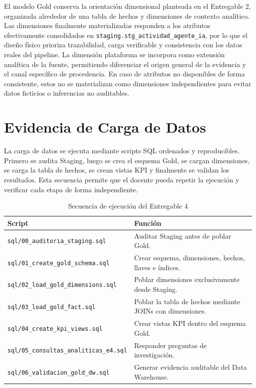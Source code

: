 \documentclass[12pt,a4paper]{article}
\newcommand{\StagingTabla}{\texttt{staging.\allowbreak stg\_actividad\_\allowbreak agente\_ia}}
\newcommand{\pathcode}[1]{\begingroup\scriptsize\ttfamily\nolinkurl{#1}\endgroup}
\begin{document}
El modelo Gold conserva la orientaci\'on dimensional planteada en el Entregable 2, organizada alrededor de una tabla de hechos y dimensiones de contexto anal\'itico. Las dimensiones finalmente materializadas responden a los atributos efectivamente consolidados en \StagingTabla{}, por lo que el dise\~no f\'isico prioriza trazabilidad, carga verificable y consistencia con los datos reales del pipeline. La dimensi\'on plataforma se incorpora como extensi\'on anal\'itica de la fuente, permitiendo diferenciar el origen general de la evidencia y el canal espec\'ifico de procedencia. En caso de atributos no disponibles de forma consistente, estos no se materializan como dimensiones independientes para evitar datos ficticios o inferencias no auditables.

\section{Evidencia de Carga de Datos}

La carga de datos se ejecuta mediante scripts SQL ordenados y reproducibles. Primero se audita Staging, luego se crea el esquema Gold, se cargan dimensiones, se carga la tabla de hechos, se crean vistas KPI y finalmente se validan los resultados. Esta secuencia permite que el docente pueda repetir la ejecuci\'on y verificar cada etapa de forma independiente.

\begin{table}[H]
\centering
\footnotesize
{}
\begin{tabular}{|P{5.1cm}|P{8.2cm}|}
\hline
{}
\textbf{Script} & \textbf{Funci\'on} \\ \hline
\pathcode{sql/00_auditoria_staging.sql} & Auditar Staging antes de poblar Gold. \\ \hline
\pathcode{sql/01_create_gold_schema.sql} & Crear esquema, dimensiones, hechos, llaves e \'indices. \\ \hline
\pathcode{sql/02_load_gold_dimensions.sql} & Poblar dimensiones exclusivamente desde Staging. \\ \hline
\pathcode{sql/03_load_gold_fact.sql} & Poblar la tabla de hechos mediante JOINs con dimensiones. \\ \hline
\pathcode{sql/04_create_kpi_views.sql} & Crear vistas KPI dentro del esquema Gold. \\ \hline
\pathcode{sql/05_consultas_analiticas_e4.sql} & Responder preguntas de investigaci\'on. \\ \hline
\pathcode{sql/06_validacion_gold_dw.sql} & Generar evidencia auditable del Data Warehouse. \\ \hline
\end{tabular}
\caption{Secuencia de ejecuci\'on del Entregable 4}
\end{table}
\end{document}
